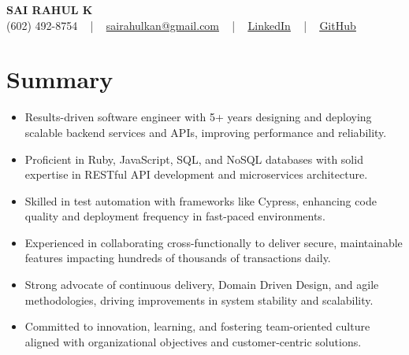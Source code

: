 \documentclass[letterpaper,11pt]{article}
\newcommand{\resumeItem}[1]{
  \item\footnotesize{
    {#1 \vspace{-2pt}}
  }
}
\newcommand{\resumeItemListStart}{\begin{itemize}[leftmargin=*]}
\newcommand{\resumeItemListEnd}{\end{itemize}\vspace{-5pt}}
\begin{document}
\begin{center}
    {\fontsize{14pt}{12pt}\selectfont \textbf{\MakeUppercase{Sai Rahul K}}}\\ \vspace{2pt}
    \fontsize{10pt}{12pt}\selectfont (602) 492-8754 ~ | ~ \href{mailto:sairahulkan@gmail.com}{sairahulkan@gmail.com} ~ | ~
    \href{https://www.linkedin.com/in/rq123/}{\color{blue}\underline{LinkedIn}} ~ | ~
    \href{https://github.com/kanrahuldo}{\color{blue}\underline{GitHub}}~
    \vspace{-8pt}
\end{center}

\section{Summary}
\fontsize{9pt}{10pt}\selectfont
\resumeItemListStart
    \resumeItem{Results-driven software engineer with 5+ years designing and deploying scalable backend services and APIs, improving performance and reliability.}
    \resumeItem{Proficient in Ruby, JavaScript, SQL, and NoSQL databases with solid expertise in RESTful API development and microservices architecture.}
    \resumeItem{Skilled in test automation with frameworks like Cypress, enhancing code quality and deployment frequency in fast-paced environments.}
    \resumeItem{Experienced in collaborating cross-functionally to deliver secure, maintainable features impacting hundreds of thousands of transactions daily.}
    \resumeItem{Strong advocate of continuous delivery, Domain Driven Design, and agile methodologies, driving improvements in system stability and scalability.}
    \resumeItem{Committed to innovation, learning, and fostering team-oriented culture aligned with organizational objectives and customer-centric solutions.}
\resumeItemListEnd
\vspace{-6pt}
\end{document}
